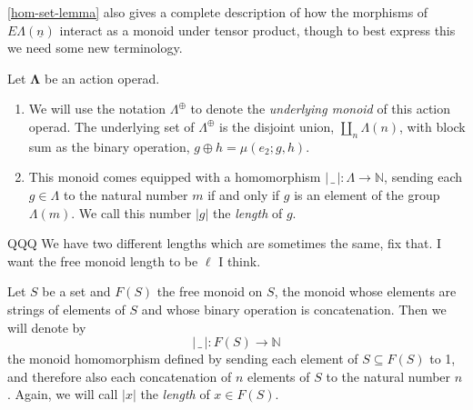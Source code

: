 \documentclass{amsbook} %
\newcommand{\ML}{\mathbf{\Lambda}}
\newcommand{\lop}{\Lambda^{\oplus}}
\newcommand{\ELn}{E\Lambda(\underline{n})}
\numberwithin{section}{chapter}
\begin{document}
\cref{hom-set-lemma} also gives a complete description of how the morphisms of $\ELn$ interact as a monoid under tensor product, though to best express this we need some new terminology.

\begin{Defi}\label{def:length} Let $\ML$ be an action operad. 
\begin{enumerate}
\item We will use the notation $\lop$ to denote the \emph{underlying monoid} of this action operad. The underlying set of $\lop$ is the disjoint union, $\coprod_n \Lambda(n)$, with block sum as the binary operation, $g \oplus h = \mu(e_2; g, h)$.

\item This monoid comes equipped with a homomorphism $| \, \_ \, | \colon \Lambda \rightarrow \mathbb{N}$, sending each $g \in \Lambda$ to the natural number $m$ if and only if $g$ is an element of the group $\Lambda(m)$. We call this number $|g|$ the \emph{length} of $g$.
\end{enumerate}
\end{Defi}

QQQ We have two different lengths which are sometimes the same, fix that. I want the free monoid length to be $\ell$ I think.

\begin{Defi}\label{lengthdef} Let $S$ be a set and $F(S)$ the free monoid on $S$, the monoid whose elements are strings of elements of $S$ and whose binary operation is concatenation. Then we will denote by
  \[
    | \, \_ \, | \colon F(S) \rightarrow \mathbb{N}
  \]
the monoid homomorphism defined by sending each element of $S \subseteq F(S)$ to 1, and therefore also each concatenation of $n$ elements of $S$ to the natural number $n$. Again, we will call $|x|$ the \emph{length} of $x \in F(S)$.
\end{Defi}
\end{document}
